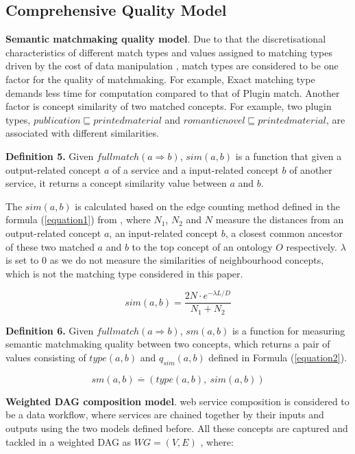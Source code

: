 \documentclass{llncs}
\begin{document}
\subsection{Comprehensive Quality Model}\label{qualityModel}

\textbf{Semantic matchmaking quality model}. Due to that the discretisational characteristics of different match types and values assigned to matching types driven by the cost of data manipulation \cite{lecue2009optimizing}, match types are considered to be one factor for the quality of matchmaking. For example, Exact matching type demands less time for computation compared to that of Plugin match. Another factor is concept similarity of two matched concepts. For example, two plugin types, $publication \sqsubseteq printedmaterial$ and $romanticnovel \sqsubseteq printedmaterial$, are associated with different similarities.

\textbf{Definition 5.} Given $full match(a \Rightarrow b)$, $sim(a, b)$ is a function that given a output-related concept $a$ of a service and a input-related concept $b$ of another service, it returns a concept similarity value between $a$ and $b$.

The $sim(a, b)$ is calculated based on the edge counting method defined in the formula (\ref{equation1}) from \cite{shet2012new}, where $N_1$, $N_2$ and $N$ measure the distances from an output-related concept $a$, an input-related concept $b$, a closest common ancestor of these two matched $a$ and $b$ to the top concept of an ontology $O$ respectively. $\lambda$ is set to 0 as we do not measure the similarities of neighbourhood concepts, which is not the matching type considered in this paper. 

\begin{equation}
sim(a, b){=} \frac{2N \cdot e^{-\lambda L/D} }{N_{1}+N_{2}}
\label{equation1}
\end{equation}

\textbf{Definition 6.} Given $full match(a \Rightarrow b)$, $sm(a,b)$ is a function for measuring semantic matchmaking quality between two concepts, which returns a pair of values consisting of $type(a, b)$ and $q_{sim}(a, b)$ defined in Formula (\ref{equation2}).


\begin{equation}
\label{equation2}
sm(a, b) \stackrel{.}{=} ( type(a, b), \  sim(a, b) )
\end{equation}

\textbf{Weighted DAG composition model}. web service composition is considered to be a data workflow, where services are chained together by their inputs and outputs using the two models defined before. All these concepts are captured and tackled in a weighted DAG as $WG = (V, E)$ , where:
\end{document}
